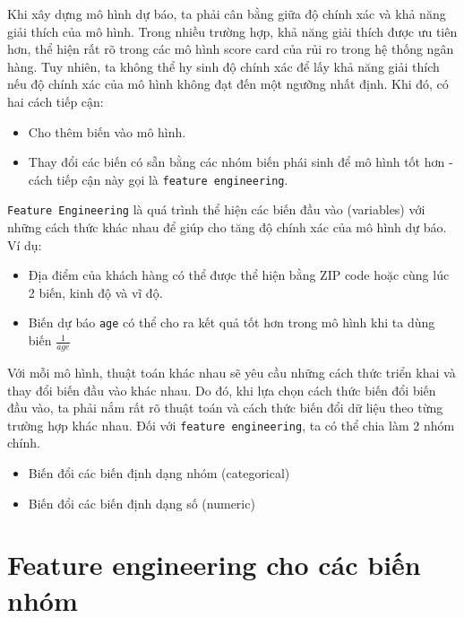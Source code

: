 \documentclass[]{krantz}
\providecommand{\tightlist}{%
  \setlength{\itemsep}{0pt}\setlength{\parskip}{0pt}}
\theoremstyle{definition}
\theoremstyle{definition}
\theoremstyle{definition}
\theoremstyle{remark}
\begin{document}
Khi xây dựng mô hình dự báo, ta phải cân bằng giữa độ chính xác và khả
năng giải thích của mô hình. Trong nhiều trường hợp, khả năng giải thích
được ưu tiên hơn, thể hiện rất rõ trong các mô hình score card của rủi
ro trong hệ thống ngân hàng. Tuy nhiên, ta không thể hy sinh độ chính
xác để lấy khả năng giải thích nếu độ chính xác của mô hình không đạt
đến một ngưỡng nhất định. Khi đó, có hai cách tiếp cận:

\begin{itemize}
\tightlist
\item
  Cho thêm biến vào mô hình.
\item
  Thay đổi các biến có sẵn bằng các nhóm biến phái sinh để mô hình tốt
  hơn - cách tiếp cận này gọi là \texttt{feature\ engineering}.
\end{itemize}

\texttt{Feature\ Engineering} là quá trình thể hiện các biến đầu vào
(variables) với những cách thức khác nhau để giúp cho tăng độ chính xác
của mô hình dự báo. Ví dụ:

\begin{itemize}
\tightlist
\item
  Địa điểm của khách hàng có thể được thể hiện bằng ZIP code hoặc cùng
  lúc 2 biến, kinh độ và vĩ độ.
\item
  Biến dự báo \texttt{age} có thể cho ra kết quả tốt hơn trong mô hình
  khi ta dùng biến \(\frac{1}{age}\)
\end{itemize}

Với mỗi mô hình, thuật toán khác nhau sẽ yêu cầu những cách thức triển
khai và thay đổi biến đầu vào khác nhau. Do đó, khi lựa chọn cách thức
biến đổi biến đầu vào, ta phải nắm rất rõ thuật toán và cách thức biến
đổi dữ liệu theo từng trường hợp khác nhau. Đối với
\texttt{feature\ engineering}, ta có thể chia làm 2 nhóm chính.

\begin{itemize}
\tightlist
\item
  Biến đổi các biến định dạng nhóm (categorical)
\item
  Biến đổi các biến định dạng số (numeric)
\end{itemize}

\hypertarget{feature-engineering-cho-cac-bin-nhom}{%
\section{Feature engineering cho các biến
nhóm}\label{feature-engineering-cho-cac-bin-nhom}}
\end{document}
